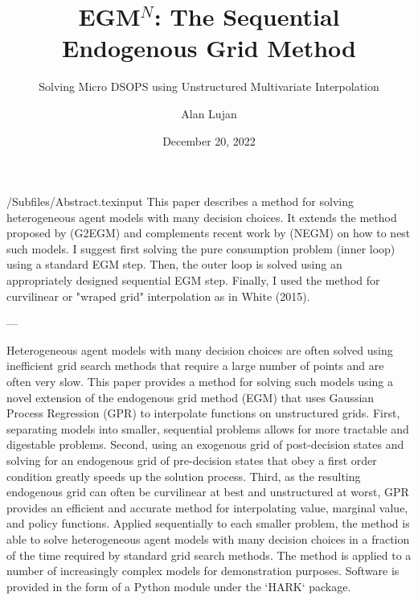 \documentclass[EGMN]{subfiles}
\begin{document}

\title{EGM$^N$: The Sequential Endogenous Grid Method}
\subtitle{Solving Micro DSOPS using Unstructured Multivariate Interpolation}

\author{Alan Lujan}

\keywords{}


\renewcommand{\forcedate}{December 20, 2022}\date{\forcedate}

\maketitle
\hypertarget{abstract}{}
\begin{verbatimwrite}{\econtexRoot/Subfiles/Abstract.texinput}
    This paper describes a method for solving heterogeneous agent models
    with many decision choices. It extends the method proposed by (G2EGM)
    and
    complements recent work by (NEGM) on how to nest such models. I suggest
    first
    solving the pure consumption problem (inner loop) using a standard EGM
    step.
    Then, the outer loop is solved using an appropriately designed
    sequential EGM
    step. Finally, I used the method for curvilinear or "wraped grid"
    interpolation
    as in White (2015).

    ---

    Heterogeneous agent models with many decision choices are often solved using inefficient
    grid search methods that require a large number of points and are often very slow.
    This paper provides a method for solving such models using a novel extension of the
    endogenous grid method (EGM) that uses Gaussian Process Regression (GPR) to interpolate
    functions on unstructured grids. First, separating models into smaller, sequential problems
    allows for more tractable and digestable problems. Second, using an exogenous grid of
    post-decision states and solving for an endogenous grid of pre-decision states that obey
    a first order condition greatly speeds up the solution process. Third, as the resulting
    endogenous grid can often be curvilinear at best and unstructured at worst, GPR provides
    an efficient and accurate method for interpolating value, marginal value, and policy functions.
    Applied sequentially to each smaller problem, the method is able to solve heterogeneous agent
    models with many decision choices in a fraction of the time required by standard grid search methods.
    The method is applied to a number of increasingly complex models for demonstration purposes.
    Software is provided in the form of a Python module under the `HARK` package.

\end{verbatimwrite}

\end{document}
